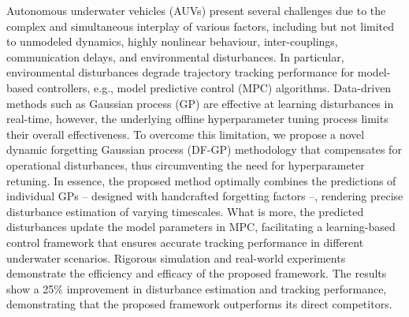 Autonomous underwater vehicles (AUVs) present several challenges due to the complex and simultaneous interplay of various factors, including but not limited to unmodeled dynamics, highly nonlinear behaviour, inter-couplings, communication delays, and environmental disturbances. In particular, environmental disturbances degrade trajectory tracking performance for model-based controllers, e.g., model predictive control (MPC) algorithms. Data-driven methods such as Gaussian process (GP) are effective at learning disturbances in real-time, however, the underlying offline hyperparameter tuning process limits their overall effectiveness. To overcome this limitation, we propose a novel dynamic forgetting Gaussian process (DF-GP) methodology that compensates for operational disturbances, thus circumventing the need for hyperparameter retuning. In essence, the proposed method optimally combines the predictions of individual GPs -- designed with handcrafted forgetting factors --, rendering precise disturbance estimation of varying timescales. What is more, the predicted disturbances update the model parameters in MPC, facilitating a learning-based control framework that ensures accurate tracking performance in different underwater scenarios. Rigorous simulation and real-world experiments demonstrate the efficiency and efficacy of the proposed framework. The results show a 25\% improvement in disturbance estimation and tracking performance, demonstrating that the proposed framework outperforms its direct competitors.%